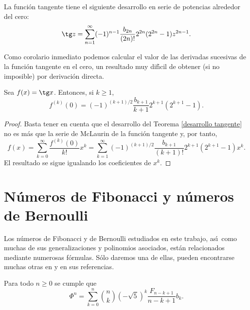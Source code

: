 \begin{theorem}\label{desarrollo tangente} La funci\'on tangente tiene el siguiente desarrollo en serie de potencias alrededor del cero:
$$\tg z=\sum_{n=1}^\infty (-1)^{n-1}\frac{b_{2n}}{(2n)!}2^{2n}(2^{2n}-1)z^{2n-1}.$$
\end{theorem}

Como corolario inmediato podemos calcular el valor de las derivadas sucesivas de la funci\'on tangente en el cero, un resultado muy dif\'\i cil de obtener (si no imposible) por derivaci\'on directa.

\begin{corollary} Sea $f(x)=\tg x$. Entonces, si $k\geq 1$,
$$f^{(k)}(0)=(-1)^{(k+1)/2}\frac{b_{k+1}}{k+1}2^{k+1}(2^{k+1}-1).$$
\end{corollary}

\begin{proof} Basta tener en cuenta que el desarrollo del Teorema \ref{desarrollo tangente} no es m\'as que la serie de McLaurin de la funci\'on tangente y, por tanto,
$$f(x)=\sum_{k=0}^\infty\frac{f^{(k)}(0)}{k!}x^k=
\sum_{k=1}^\infty (-1)^{(k+1)/2}\frac{b_{k+1}}{(k+1)!}2^{k+1}(2^{k+1}-1)x^k.$$
El resultado se sigue igualando los coeficientes de $x^k$.
\end{proof}

\section{N\'umeros de Fibonacci y n\'umeros de Bernoulli}

Los n\'umeros de Fibonacci y de Bernoulli estudiados en este trabajo, as\'\i\ como muchas de sus generalizaciones y polinomios asociados, est\'an relacionados mediante numerosas f\'ormulas. S\'olo daremos una de ellas, pueden encontrarse muchas otras en \cite{Byrd} y en sus referencias.

\begin{theorem} Para todo $n\geq 0$ se cumple que
$$\Phi^n=\sum_{k=0}^n {n\choose k}(-\sqrt 5)^k\frac{F_{n-k+1}}{n-k+1}b_k.$$
\end{theorem}


